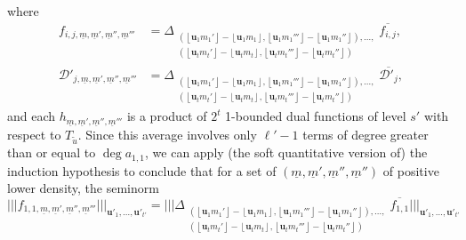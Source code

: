 \documentclass[11pt]{amsart}
\theoremstyle{definition}
\DeclareMathOperator*{\E}{\mathbb{E}}
\newcommand{\CD}{{\mathcal D}}
\newcommand{\bu}{{\mathbf{u}}}
\newcommand{\um}{{\underline{m}}}
\newcommand{\nnorm}[1]{\lvert\!|\!| #1|\!|\!\rvert}
\newcommand{\Bignnorm}[1]{\Big|\!\Big|\!\Big| #1\Big|\!\Big|\!\Big|}
\newcommand{\1}{{\mathbf{1}}}
\newcommand{\floor}[1]{{\left \lfloor #1 \right \rfloor}}
\begin{document}
        where
        \begin{align*}
            f_{i,j,\um,\um',\um'',\um'''} &= \Delta_{\substack{(\floor{\bu_1 m_1'} - \floor{\bu_1 m_1}, \floor{\bu_1 m_1'''} - \floor{\bu_1 m_1''}), \ldots,\\ (\floor{\bu_{t} m_{t}'} - \floor{\bu_{t} m_{t}}, \floor{\bu_{t} m_{t}'''} - \floor{\bu_{t} m_{t}''})}}\overline{f_{i,j}},\\
            \CD'_{j,\um,\um',\um'',\um'''} &= \Delta_{\substack{(\floor{\bu_1 m_1'} - \floor{\bu_1 m_1}, \floor{\bu_1 m_1'''} - \floor{\bu_1 m_1''}), \ldots,\\ (\floor{\bu_{t} m_{t}'} - \floor{\bu_{t} m_{t}}, \floor{\bu_{t} m_{t}'''} - \floor{\bu_{t} m_{t}''})}}\overline{\CD'_{j}},
        \end{align*}
    and each $h_{\um,\um',\um'',\um'''}$ is a product of $2^{t}$ 1-bounded dual functions of level $s'$ with respect to $T_{\tilde{u}}$.
     Since this average involves only $\ell'-1$ terms of degree greater than or equal to $\deg a_{1,1}$, we can apply (the soft quantitative version of) the induction hypothesis to conclude that for a set of $(\um,\um',\um'',\um'')$ of positive lower density, the seminorm
$$\nnorm{f_{1,1,\um,\um',\um'',\um'''}}_{\bu'_{1},\dots,\bu'_{t'}}=\Bignnorm{\Delta_{\substack{(\floor{\bu_1 m_1'} - \floor{\bu_1 m_1}, \floor{\bu_1 m_1'''} - \floor{\bu_1 m_1''}), \ldots,\\ (\floor{\bu_{t} m_{t}'} - \floor{\bu_{t} m_{t}}, \floor{\bu_{t} m_{t}'''} - \floor{\bu_{t} m_{t}''})}}\overline{f_{1,1}}}_{\bu'_{1},\dots,\bu'_{t'}}$$
\end{document}

